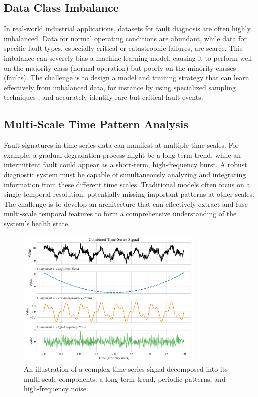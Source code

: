 \subsection{Data Class Imbalance}
In real-world industrial applications, datasets for fault diagnosis are often highly imbalanced. Data for normal operating conditions are abundant, while data for specific fault types, especially critical or catastrophic failures, are scarce. This imbalance can severely bias a machine learning model, causing it to perform well on the majority class (normal operation) but poorly on the minority classes (faults). The challenge is to design a model and training strategy that can learn effectively from imbalanced data, for instance by using specialized sampling techniques \cite{chawla2002smote}, and accurately identify rare but critical fault events.

\subsection{Multi-Scale Time Pattern Analysis}
Fault signatures in time-series data can manifest at multiple time scales. For example, a gradual degradation process might be a long-term trend, while an intermittent fault could appear as a short-term, high-frequency burst. A robust diagnostic system must be capable of simultaneously analyzing and integrating information from these different time scales. Traditional models often focus on a single temporal resolution, potentially missing important patterns at other scales. The challenge is to develop an architecture that can effectively extract and fuse multi-scale temporal features \cite{zhang2019deep} to form a comprehensive understanding of the system's health state.

\begin{figure}[h!]
\centering
\includegraphics[width=0.8\textwidth]{logos/multi_scale_timeseries_decomposition.pdf}
\caption{An illustration of a complex time-series signal decomposed into its multi-scale components: a long-term trend, periodic patterns, and high-frequency noise.}
\label{fig:multi_scale_decomposition}
\end{figure}

